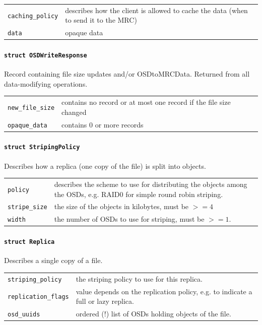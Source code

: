 \begin{tabularx}{\textwidth}{lX}
 \texttt{caching\_policy} & describes how the client is allowed to cache the data (when to send it to the MRC\index{MRC})\\
 \texttt{data} & opaque data
\end{tabularx}

\paragraph{\texttt{struct OSDWriteResponse}}
Record containing file size updates and/or OSDtoMRCData. Returned from all data-modifying operations.

\begin{tabularx}{\textwidth}{lX}
 \texttt{new\_file\_size} & contains no record or at most one record if the file size changed\\
 \texttt{opaque\_data} & contains 0 or more records
\end{tabularx}


\paragraph{\texttt{struct StripingPolicy}}
Describes how a replica (one copy of the file) is split into objects.

\begin{tabularx}{\textwidth}{lX}
 \texttt{policy} & describes the scheme to use for distributing the objects among the OSDs\index{OSD}, e.g. RAID0 for simple round robin striping.\\
 \texttt{stripe\_size} & the size of the objects in kilobytes, must be $>= 4$\\
 \texttt{width} & the number of OSDs\index{OSD} to use for striping, must be $>= 1$.
\end{tabularx}


\paragraph{\texttt{struct Replica}}
Describes a single copy of a file.

\begin{tabularx}{\textwidth}{lX}
 \texttt{striping\_policy} & the striping policy to use for this replica.\\
 \texttt{replication\_flags} & value depends on the replication policy, e.g. to indicate a full or lazy replica.\\
 \texttt{osd\_uuids} & ordered (!) list of OSDs\index{OSD} holding objects of the file.
\end{tabularx}



